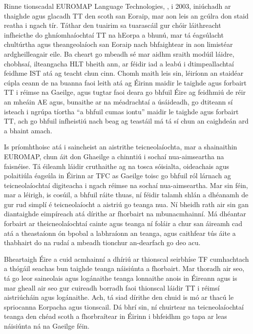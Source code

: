 \begin{multicols}{2}
Rinne tionscadal EUROMAP Language Technologies, \cite{euromap}, i 2003, iniúchadh ar thaighde agus glacadh TT den scoth san Eoraip, mar aon leis an gcúlra don staid reatha i ngach tír. Táthar den tuairim sa tuarascáil gur chóir láithreacht infheicthe do ghníomhaíochtaí TT na hEorpa a bhunú, mar tá éagsúlacht chultúrtha agus theangeolaíoch san Eoraip nach bhfaightear in aon limistéar ardgheilleagair eile. Ba cheart go mbeadh sé mar aidhm sraith modúil láidre, chobhsaí, ilteangacha HLT bheith ann, ar féidir iad a leabú i dtimpeallachtaí feidhme IST atá ag teacht chun cinn. Chomh maith leis sin, léiríonn an staidéar cúpla ceann de na buanna faoi leith atá ag Éirinn maidir le taighde agus forbairt TT i réimse na Gaeilge, agus tugtar faoi deara go bhfuil Éire ag feidhmiú de réir an mheáin AE agus, bunaithe ar na méadrachtaí a úsáideadh, go dtiteann sí isteach i ngrúpa tíortha ``a bhfuil cumas iontu'' maidir le taighde agus forbairt TT, ach go bhfuil infheistiú nach beag ag teastáil má tá sí chun an caighdeán ard a bhaint amach.

Is príomhthoisc atá i saincheist an aistrithe teicneolaíochta, mar a shainaithin EUROMAP, chun áit don Ghaeilge a chinntiú i sochaí nua-aimseartha na faisnéise.  Tá éileamh láidir cruthaithe ag na tosca sóisialta, oideachais agus polaitiúla éagsúla in Éirinn ar TFC as Gaeilge toisc go bhfuil ról lárnach ag teicneolaíochtaí digiteacha i ngach réimse na sochaí nua-aimseartha. Mar sin féin, mar a léirigh, is cosúil, a bhfuil ráite thuas, ní féidir talamh shlán a dhéanamh de gur rud simplí é teicneolaíocht a aistriú go teanga nua. Ní bheidh rath air sin gan diantaighde eimpíreach atá dírithe ar fhorbairt na mbunacmhainní. Má dhéantar forbairt ar theicneolaíochtaí cainte agus teanga ní foláir a chur san áireamh cad atá a theastaíonn ón bpobal a labhraíonn an teanga, agus caithfear tús áite a thabhairt do na rudaí a mbeadh tionchur an-dearfach go deo acu.

Bheartaigh Éire a cuid acmhainní a dhíriú ar thionscal seirbhíse TF cumhachtach a thógáil seachas bun taighde teanga náisiúnta a fhorbairt. Mar thoradh air seo, tá go leor saineolais agus logánaithe teanga lonnaithe anois in Éireann  agus is mar gheall air seo gur cuireadh borradh faoi thionscal láidir TT i réimsí aistriúcháin agus logánaithe. Ach, tá siad dírithe den chuid is mó ar thacú le spriocanna Eorpacha agus tionscail. Dá bhrí sin, ní chuirtear na teicneolaíochtaí teanga den chéad scoth a fhorbraítear in Éirinn i bhfeidhm go tapa ar leas náisiúnta ná na Gaeilge féin.


\end{multicols}

